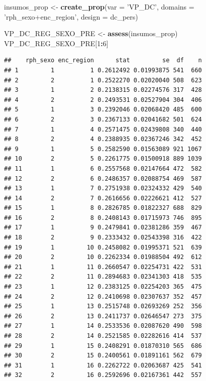 \documentclass[]{book}
\newenvironment{Shaded}{\begin{snugshade}}{\end{snugshade}}
\newcommand{\DataTypeTok}[1]{\textcolor[rgb]{0.13,0.29,0.53}{#1}}
\newcommand{\DecValTok}[1]{\textcolor[rgb]{0.00,0.00,0.81}{#1}}
\newcommand{\KeywordTok}[1]{\textcolor[rgb]{0.13,0.29,0.53}{\textbf{#1}}}
\newcommand{\NormalTok}[1]{#1}
\newcommand{\OperatorTok}[1]{\textcolor[rgb]{0.81,0.36,0.00}{\textbf{#1}}}
\newcommand{\StringTok}[1]{\textcolor[rgb]{0.31,0.60,0.02}{#1}}
\theoremstyle{definition}
\theoremstyle{definition}
\theoremstyle{definition}
\theoremstyle{definition}
\theoremstyle{remark}
\begin{document}
\begin{Shaded}
\begin{Highlighting}[]
\NormalTok{insumos_prop <-}\StringTok{ }\KeywordTok{create_prop}\NormalTok{(}\DataTypeTok{var =} \StringTok{'VP_DC'}\NormalTok{, }
                                   \DataTypeTok{domains =} \StringTok{'rph_sexo+enc_region'}\NormalTok{, }
                                   \DataTypeTok{design =}\NormalTok{  dc_pers)}

\NormalTok{VP_DC_REG_SEXO_PRE <-}\StringTok{ }\KeywordTok{assess}\NormalTok{(insumos_prop)}
\NormalTok{VP_DC_REG_SEXO_PRE[}\DecValTok{1}\OperatorTok{:}\DecValTok{6}\NormalTok{]}
\end{Highlighting}
\end{Shaded}

\begin{verbatim}
##    rph_sexo enc_region      stat         se  df    n
## 1         1          1 0.2612492 0.01993875 541  660
## 2         2          1 0.2522270 0.02020040 508  623
## 3         1          2 0.2138315 0.02274576 317  428
## 4         2          2 0.2493531 0.02527904 304  406
## 5         1          3 0.2392046 0.02068420 485  600
## 6         2          3 0.2367133 0.02041682 501  624
## 7         1          4 0.2571475 0.02439808 340  440
## 8         2          4 0.2388935 0.02367246 342  452
## 9         1          5 0.2582590 0.01563089 921 1067
## 10        2          5 0.2261775 0.01500918 889 1039
## 11        1          6 0.2557568 0.02147664 472  582
## 12        2          6 0.2486357 0.02088754 469  587
## 13        1          7 0.2751938 0.02324332 429  540
## 14        2          7 0.2616656 0.02226621 412  527
## 15        1          8 0.2826785 0.01822327 688  829
## 16        2          8 0.2408143 0.01715973 746  895
## 17        1          9 0.2479841 0.02381286 359  467
## 18        2          9 0.2333432 0.02543398 316  422
## 19        1         10 0.2458082 0.01995371 521  639
## 20        2         10 0.2262334 0.01988504 492  612
## 21        1         11 0.2660547 0.02254731 422  531
## 22        2         11 0.2894683 0.02341303 418  535
## 23        1         12 0.2383125 0.02254203 365  475
## 24        2         12 0.2410698 0.02307637 352  457
## 25        1         13 0.2515748 0.02693269 252  356
## 26        2         13 0.2411737 0.02646547 273  375
## 27        1         14 0.2533536 0.02087620 490  598
## 28        2         14 0.2521585 0.02282616 414  537
## 29        1         15 0.2408291 0.01870310 565  686
## 30        2         15 0.2400561 0.01891161 562  679
## 31        1         16 0.2262722 0.02063687 425  541
## 32        2         16 0.2592696 0.02167361 442  557
\end{verbatim}
\end{document}
